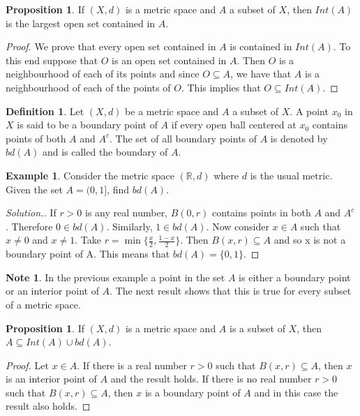 \documentclass[11pt,a4paper]{article}
\theoremstyle{definition}
\newtheorem{defn}[thm]{Definition}
\newtheorem{exa}[thm]{Example}
\newtheorem{prop}[thm]{Proposition}
\newtheorem*{note}{Note}
\newenvironment{solution}
  {\renewcommand{\qedsymbol}{}\begin{proof}[\textit{Solution}.]}
  {\end{proof}}
\begin{document}
\begin{prop}
If $(X,d)$ is a metric space and $A$ a subset of $X$, then $Int(A)$ is the largest open set contained in $A$.
\end{prop}


\begin{proof}
We prove that every open set contained in $A$ is contained in $Int(A)$. To this end suppose that $O$ is an open set contained in $A$. Then $O$ is a neighbourhood of each of its points and since $O\subseteq A$, we have that $A$ is a neighbourhood of each of the points of $O$. This implies that $O\subseteq Int(A)$.
\end{proof}


\begin{defn}
Let $(X,d)$ be a metric space and $A$ a subset of $X$. A point $x_0$ in $X$ is said to be a boundary point of $A$ if every open ball centered at $x_0$ contains points of both $A$ and $A^c$. The set of all boundary points of $A$ is denoted by $bd(A)$ and is called the boundary of $A$.
\end{defn}

\begin{exa}
Consider the metric space $(\mathbb{R},d)$ where $d$ is the usual metric. Given the set $A=(0,1]$, find $bd(A)$.
\end{exa}

\begin{solution}
If $r>0$ is any real number, $B(0,r)$ contains points in both $A$ and $A^c$. Therefore $0\in bd(A)$. Similarly, $1\in bd(A)$. Now consider $x\in A$ such that $x\neq 0$ and $x\neq 1$. Take $r=\min\{\frac{x}{2},\frac{1-x}{2}\}$. Then $B(x,r)\subseteq A$ and so x is not a boundary point of A. This means that $bd(A)=\{0,1\}$.
\end{solution}


\begin{note}
In the previous example  a point in the set $A$ is either a boundary point or an interior point of $A$. The next result shows that this is true for every subset of a metric space.
\end{note}


\begin{prop}
If $(X,d)$ is a metric space and $A$ is a subset of $X$, then $A\subseteq Int(A)\cup bd(A)$.
\end{prop}

\begin{proof}
Let $x\in A$. If there is a real number $r>0$ such that $B(x,r)\subseteq A$, then $x $is an interior point of $A$ and the result holds. If there is no real number $r>0$ such that $B(x,r)\subseteq A$, then $x$ is a boundary point of $A$ and in this case the result also holds.
\end{proof}
\end{document}
